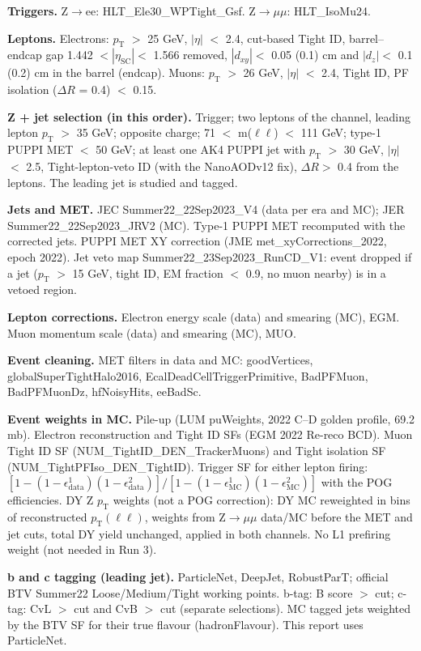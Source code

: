\documentclass[11pt,a4paper]{article}
\newcommand{\Zee}{Z$\to$ee}
\newcommand{\Zmm}{Z$\to\mu\mu$}
\newcommand{\pt}{$p_\mathrm{T}$}
\newcommand{\aeta}{$|\eta|$}
\begin{document}
\textbf{Triggers.} \Zee: HLT\_Ele30\_WPTight\_Gsf. \Zmm: HLT\_IsoMu24.

\textbf{Leptons.} Electrons: \pt{} $>$ 25 GeV, \aeta{} $<$ 2.4, cut-based Tight ID, barrel--endcap gap 1.442 $<|\eta_\mathrm{SC}|<$ 1.566
removed, $|d_{xy}|<$ 0.05 (0.1) cm and $|d_z|<$ 0.1 (0.2) cm in the barrel (endcap). Muons: \pt{} $>$ 26 GeV, \aeta{} $<$ 2.4, Tight ID,
PF isolation ($\Delta R$ = 0.4) $<$ 0.15.

\textbf{Z + jet selection (in this order).} Trigger; two leptons of the channel, leading lepton \pt{} $>$ 35 GeV; opposite charge;
71 $<$ m($\ell\ell$) $<$ 111 GeV; type-1 PUPPI MET $<$ 50 GeV; at least one AK4 PUPPI jet with \pt{} $>$ 30 GeV, \aeta{} $<$ 2.5,
Tight-lepton-veto ID (with the NanoAODv12 fix), $\Delta R>$ 0.4 from the leptons. The leading jet is studied and tagged.

\textbf{Jets and MET.} JEC Summer22\_22Sep2023\_V4 (data per era and MC); JER Summer22\_22Sep2023\_JRV2 (MC). Type-1 PUPPI MET recomputed
with the corrected jets. PUPPI MET XY correction (JME met\_xyCorrections\_2022, epoch 2022). Jet veto map Summer22\_23Sep2023\_RunCD\_V1:
event dropped if a jet (\pt{} $>$ 15 GeV, tight ID, EM fraction $<$ 0.9, no muon nearby) is in a vetoed region.

\textbf{Lepton corrections.} Electron energy scale (data) and smearing (MC), EGM. Muon momentum scale (data) and smearing (MC), MUO.

\textbf{Event cleaning.} MET filters in data and MC: goodVertices, globalSuperTightHalo2016, EcalDeadCellTriggerPrimitive, BadPFMuon,
BadPFMuonDz, hfNoisyHits, eeBadSc.

\textbf{Event weights in MC.} Pile-up (LUM puWeights, 2022 C--D golden profile, 69.2 mb). Electron reconstruction and Tight ID SFs
(EGM 2022 Re-reco BCD). Muon Tight ID SF (NUM\_TightID\_DEN\_TrackerMuons) and Tight isolation SF (NUM\_TightPFIso\_DEN\_TightID).
Trigger SF for either lepton firing: $[1-(1-\epsilon^1_\mathrm{data})(1-\epsilon^2_\mathrm{data})]/[1-(1-\epsilon^1_\mathrm{MC})(1-\epsilon^2_\mathrm{MC})]$
with the POG efficiencies. DY Z \pt{} weights (not a POG correction): DY MC reweighted in bins of reconstructed $p_\mathrm{T}(\ell\ell)$,
weights from \Zmm{} data/MC before the MET and jet cuts, total DY yield unchanged, applied in both channels. No L1 prefiring weight (not needed in Run 3).

\textbf{b and c tagging (leading jet).} ParticleNet, DeepJet, RobustParT; official BTV Summer22 Loose/Medium/Tight working points.
b-tag: B score $>$ cut; c-tag: CvL $>$ cut and CvB $>$ cut (separate selections). MC tagged jets weighted by the BTV SF for their true
flavour (hadronFlavour). This report uses ParticleNet.
\end{document}
